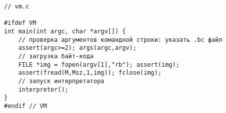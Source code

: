 \clearpage
{}\label{init}
\begin{verbatim}// vm.c

#ifdef VM
int main(int argc, char *argv[]) {
    // проверка аргументов командной строки: указать .bc файл
    assert(argc>=2); args(argc,argv);
    // загрузка байт-кода
    FILE *img = fopen(argv[1],"rb"); assert(img);
    assert(fread(M,Msz,1,img)); fclose(img);
    // запуск интерпретатора
    interpreter();
}
#endif // VM
\end{verbatim}

\secup
